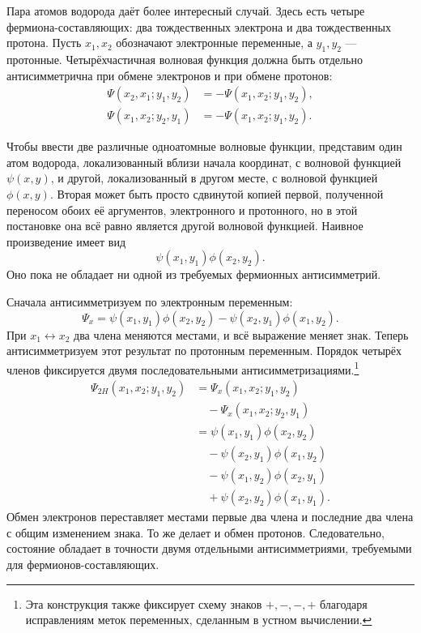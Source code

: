 Пара атомов водорода даёт более интересный случай. Здесь есть четыре фермиона-составляющих: два тождественных электрона и два тождественных протона. Пусть \(x_1,x_2\) обозначают электронные переменные, а \(y_1,y_2\) — протонные. Четырёхчастичная волновая функция должна быть отдельно антисимметрична при обмене электронов и при обмене протонов:
\begin{align}
\Psi(x_2,x_1;y_1,y_2)
&=-\Psi(x_1,x_2;y_1,y_2),\\
\Psi(x_1,x_2;y_2,y_1)
&=-\Psi(x_1,x_2;y_1,y_2).
\end{align}

Чтобы ввести две различные одноатомные волновые функции, представим один атом водорода, локализованный вблизи начала координат, с волновой функцией \(\psi(x,y)\), и другой, локализованный в другом месте, с волновой функцией \(\phi(x,y)\). Вторая может быть просто сдвинутой копией первой, полученной переносом обоих её аргументов, электронного и протонного, но в этой постановке она всё равно является другой волновой функцией. Наивное произведение имеет вид
\begin{equation}
\psi(x_1,y_1)\phi(x_2,y_2).
\end{equation}
Оно пока не обладает ни одной из требуемых фермионных антисимметрий.

Сначала антисимметризуем по электронным переменным:
\begin{equation}
\Psi_x=
\psi(x_1,y_1)\phi(x_2,y_2)
-\psi(x_2,y_1)\phi(x_1,y_2).
\end{equation}
При \(x_1\leftrightarrow x_2\) два члена меняются местами, и всё выражение меняет знак. Теперь антисимметризуем этот результат по протонным переменным. Порядок четырёх членов фиксируется двумя последовательными антисимметризациями.\footnote{Эта конструкция также фиксирует схему знаков \(+,-,-,+\) благодаря исправлениям меток переменных, сделанным в устном вычислении.}
\begin{align}
\Psi_{2H}(x_1,x_2;y_1,y_2)
&=\Psi_x(x_1,x_2;y_1,y_2)\nonumber\\
&\quad{}-\Psi_x(x_1,x_2;y_2,y_1)\\
&=\psi(x_1,y_1)\phi(x_2,y_2)\nonumber\\
&\quad{}-\psi(x_2,y_1)\phi(x_1,y_2)\nonumber\\
&\quad{}-\psi(x_1,y_2)\phi(x_2,y_1)\nonumber\\
&\quad{}+\psi(x_2,y_2)\phi(x_1,y_1).
\label{eq:two-hydrogen-antisymmetrized}
\end{align}
Обмен электронов переставляет местами первые два члена и последние два члена с общим изменением знака. То же делает и обмен протонов. Следовательно, состояние обладает в точности двумя отдельными антисимметриями, требуемыми для фермионов-составляющих.

